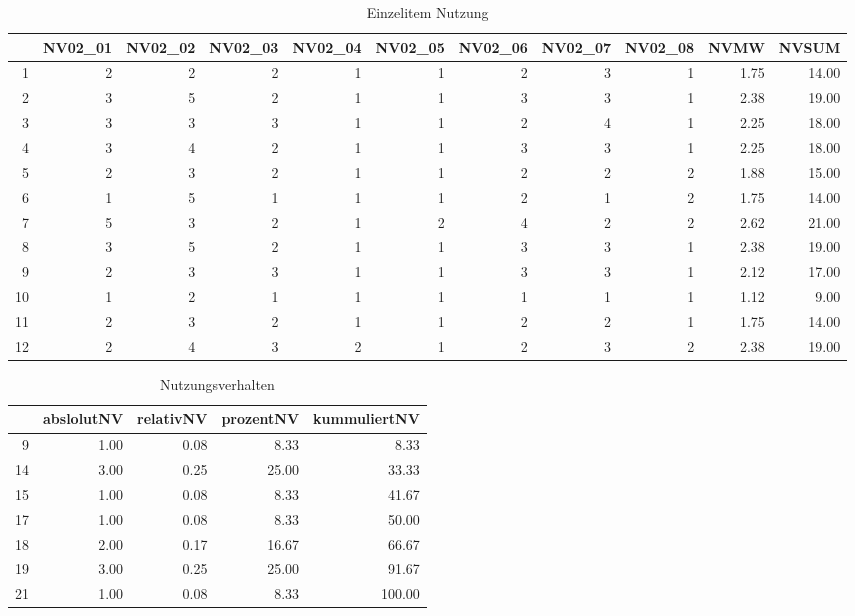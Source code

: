 \begin{table}[ht]
\centering
\caption{Einzelitem Nutzung}
\begin{tabular}{rrrrrrrrrrr}
  \hline
 & NV02\_01 & NV02\_02 & NV02\_03 & NV02\_04 & NV02\_05 & NV02\_06 & NV02\_07 & NV02\_08 & NVMW & NVSUM \\
  \hline
1 &   2 &   2 &   2 &   1 &   1 &   2 &   3 &   1 & 1.75 & 14.00 \\
  2 &   3 &   5 &   2 &   1 &   1 &   3 &   3 &   1 & 2.38 & 19.00 \\
  3 &   3 &   3 &   3 &   1 &   1 &   2 &   4 &   1 & 2.25 & 18.00 \\
  4 &   3 &   4 &   2 &   1 &   1 &   3 &   3 &   1 & 2.25 & 18.00 \\
  5 &   2 &   3 &   2 &   1 &   1 &   2 &   2 &   2 & 1.88 & 15.00 \\
  6 &   1 &   5 &   1 &   1 &   1 &   2 &   1 &   2 & 1.75 & 14.00 \\
  7 &   5 &   3 &   2 &   1 &   2 &   4 &   2 &   2 & 2.62 & 21.00 \\
  8 &   3 &   5 &   2 &   1 &   1 &   3 &   3 &   1 & 2.38 & 19.00 \\
  9 &   2 &   3 &   3 &   1 &   1 &   3 &   3 &   1 & 2.12 & 17.00 \\
  10 &   1 &   2 &   1 &   1 &   1 &   1 &   1 &   1 & 1.12 & 9.00 \\
  11 &   2 &   3 &   2 &   1 &   1 &   2 &   2 &   1 & 1.75 & 14.00 \\
  12 &   2 &   4 &   3 &   2 &   1 &   2 &   3 &   2 & 2.38 & 19.00 \\
   \hline
\end{tabular}
\end{table}

\begin{table}[ht]
\centering
\caption{Nutzungsverhalten}
\begin{tabular}{rrrrr}
  \hline
 & abslolutNV & relativNV & prozentNV & kummuliertNV \\
  \hline
9 & 1.00 & 0.08 & 8.33 & 8.33 \\
  14 & 3.00 & 0.25 & 25.00 & 33.33 \\
  15 & 1.00 & 0.08 & 8.33 & 41.67 \\
  17 & 1.00 & 0.08 & 8.33 & 50.00 \\
  18 & 2.00 & 0.17 & 16.67 & 66.67 \\
  19 & 3.00 & 0.25 & 25.00 & 91.67 \\
  21 & 1.00 & 0.08 & 8.33 & 100.00 \\
   \hline
\end{tabular}
\end{table}
